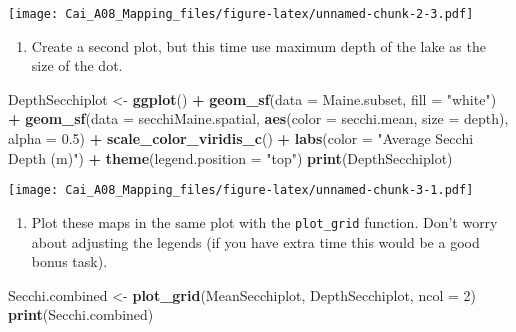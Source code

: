 \documentclass[]{article}
\newenvironment{Shaded}{\begin{snugshade}}{\end{snugshade}}
\newcommand{\DataTypeTok}[1]{\textcolor[rgb]{0.13,0.29,0.53}{#1}}
\newcommand{\DecValTok}[1]{\textcolor[rgb]{0.00,0.00,0.81}{#1}}
\newcommand{\FloatTok}[1]{\textcolor[rgb]{0.00,0.00,0.81}{#1}}
\newcommand{\KeywordTok}[1]{\textcolor[rgb]{0.13,0.29,0.53}{\textbf{#1}}}
\newcommand{\NormalTok}[1]{#1}
\newcommand{\OperatorTok}[1]{\textcolor[rgb]{0.81,0.36,0.00}{\textbf{#1}}}
\newcommand{\StringTok}[1]{\textcolor[rgb]{0.31,0.60,0.02}{#1}}
\providecommand{\tightlist}{%
  \setlength{\itemsep}{0pt}\setlength{\parskip}{0pt}}
\begin{document}
\texttt{[image: Cai\_A08\_Mapping\_files/figure-latex/unnamed-chunk-2-3.pdf]}

\begin{enumerate}
\def\labelenumi{\arabic{enumi}.}
\setcounter{enumi}{6}
\tightlist
\item
  Create a second plot, but this time use maximum depth of the lake as
  the size of the dot.
\end{enumerate}

\begin{Shaded}
\begin{Highlighting}[]
\NormalTok{DepthSecchiplot <-}\StringTok{ }\KeywordTok{ggplot}\NormalTok{() }\OperatorTok{+}
\StringTok{  }\KeywordTok{geom_sf}\NormalTok{(}\DataTypeTok{data =}\NormalTok{ Maine.subset, }\DataTypeTok{fill =} \StringTok{"white"}\NormalTok{) }\OperatorTok{+}
\StringTok{  }\KeywordTok{geom_sf}\NormalTok{(}\DataTypeTok{data =}\NormalTok{ secchiMaine.spatial, }\KeywordTok{aes}\NormalTok{(}\DataTypeTok{color =}\NormalTok{ secchi.mean, }\DataTypeTok{size =}\NormalTok{ depth),}
          \DataTypeTok{alpha =} \FloatTok{0.5}\NormalTok{) }\OperatorTok{+}
\StringTok{  }\KeywordTok{scale_color_viridis_c}\NormalTok{() }\OperatorTok{+}
\StringTok{  }\KeywordTok{labs}\NormalTok{(}\DataTypeTok{color =} \StringTok{"Average Secchi Depth (m)"}\NormalTok{) }\OperatorTok{+}
\StringTok{  }\KeywordTok{theme}\NormalTok{(}\DataTypeTok{legend.position =} \StringTok{"top"}\NormalTok{)}
\KeywordTok{print}\NormalTok{(DepthSecchiplot)}
\end{Highlighting}
\end{Shaded}

\texttt{[image: Cai\_A08\_Mapping\_files/figure-latex/unnamed-chunk-3-1.pdf]}

\begin{enumerate}
\def\labelenumi{\arabic{enumi}.}
\setcounter{enumi}{7}
\tightlist
\item
  Plot these maps in the same plot with the \texttt{plot\_grid}
  function. Don't worry about adjusting the legends (if you have extra
  time this would be a good bonus task).
\end{enumerate}

\begin{Shaded}
\begin{Highlighting}[]
\NormalTok{Secchi.combined <-}
\StringTok{  }\KeywordTok{plot_grid}\NormalTok{(MeanSecchiplot, DepthSecchiplot,}
            \DataTypeTok{ncol =} \DecValTok{2}\NormalTok{)}
\KeywordTok{print}\NormalTok{(Secchi.combined)}
\end{Highlighting}
\end{Shaded}
\end{document}
